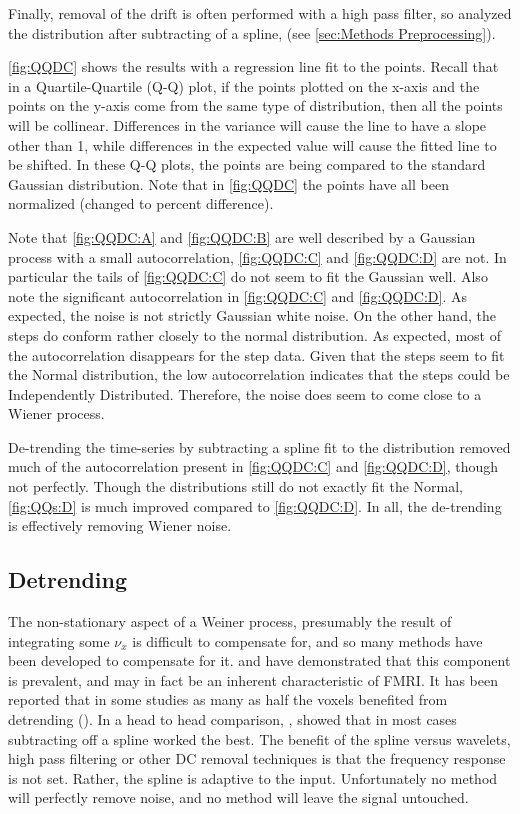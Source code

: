 Finally, removal of the drift is often performed with a high pass filter,
so analyzed the distribution after subtracting of a spline, (see \autoref{sec:Methods Preprocessing}).

\autoref{fig:QQDC} shows the 
results with a regression line fit to the points.
Recall that in a Quartile-Quartile (Q-Q) plot, if the points plotted on the 
x-axis and the points
on the y-axis come from the same type of distribution, then all the points will
be collinear. Differences in the variance will cause the line to have a slope
other than 1, while differences in the expected value will cause the fitted line
to be shifted. In these Q-Q plots, the points are being compared to the standard
Gaussian distribution. Note that in \autoref{fig:QQDC} the points have all been 
normalized (changed to percent difference).

Note that \autoref{fig:QQDC:A} and \autoref{fig:QQDC:B}
are well described by a Gaussian process with a small autocorrelation, 
\autoref{fig:QQDC:C} and \autoref{fig:QQDC:D} are not. In particular the tails of \autoref{fig:QQDC:C}
do not seem to fit the Gaussian well. Also note the significant autocorrelation in
\autoref{fig:QQDC:C} and \autoref{fig:QQDC:D}. As expected, the noise is not strictly
Gaussian white noise.  On the other hand, the steps do conform rather
closely to the normal distribution.
As expected, most of the autocorrelation disappears for the step data. Given
that the steps seem to fit the Normal distribution, the low autocorrelation
indicates that the steps could be Independently Distributed. 
Therefore, the noise does seem to come close to a Wiener process. 

De-trending the time-series by subtracting a spline fit to the distribution
removed much of the autocorrelation present in \autoref{fig:QQDC:C} and \autoref{fig:QQDC:D},
though not perfectly. Though the distributions still do not exactly fit
the Normal, \autoref{fig:QQs:D} is much improved compared to \autoref{fig:QQDC:D}.
In all, the de-trending is effectively removing Wiener noise. 

\subsection{Detrending}
\label{sec:Detrend}
The non-stationary
aspect of a Weiner process, presumably the result of integrating some
$\nu_x$ is difficult to compensate for, and so many methods
have been developed to compensate for it. \cite{Tanabe2002} and \cite{Smith1999} have
demonstrated that this component is prevalent, and may in fact be an inherent  characteristic
of FMRI. It has been reported that in some studies as many as half the voxels 
benefited from detrending (\cite{Smith2007}). In a head to head comparison, 
\cite{Tanabe2002}, showed that in most cases subtracting off
a spline worked the best. The benefit of the spline versus wavelets, high pass 
filtering or other DC removal techniques is that the frequency response is not set.
Rather, the spline is adaptive to the input. Unfortunately no method will 
perfectly remove noise, and no method will leave the signal untouched.

